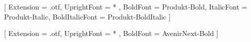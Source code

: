\usepackage{fontspec}



\setmainfont{Produkt-Regular.otf}[
  Extension = .otf,
  UprightFont = * ,
  BoldFont = Produkt-Bold,
  ItalicFont = Produkt-Italic,
  BoldItalicFont = Produkt-BoldItalic
]

\newfontfamily{}[
  Extension = .otf,
  UprightFont = * ,
  BoldFont = AvenirNext-Bold
]